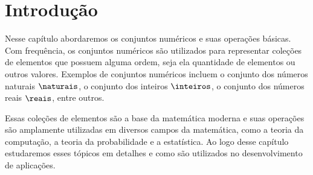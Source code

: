 \section{Introdução}

Nesse capítulo abordaremos os conjuntos numéricos e suas operações básicas. Com frequência, os conjuntos numéricos são utilizados para representar coleções de elementos que possuem alguma ordem, seja ela quantidade de elementos ou outros valores. Exemplos de conjuntos numéricos incluem o conjunto dos números naturais $\naturais$, o conjunto dos inteiros $\inteiros$, o conjunto dos números reais $\reais$, entre outros.

Essas coleções de elementos são a base da matemática moderna e suas operações são amplamente utilizadas em diversos campos da matemática, como a teoria da computação, a teoria da probabilidade e a estatística. Ao logo desse capítulo estudaremos esses tópicos em detalhes e como são utilizados no desenvolvimento de aplicações.